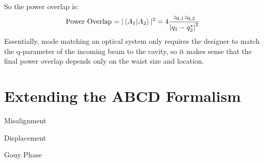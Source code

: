 \begin{appendices}
	So the power overlap is:
	\begin{equation}
	\text{Power Overlap} = \vert \braket{A_1|A_2} \vert^2 = 4 \frac{ z_{0,1}z_{0,2}}{\abs{q_1 - q_2^*}^2}
	\end{equation}
	Essentially, mode matching an optical system only requires the designer to match the q-parameter of the incoming beam to the cavity, so it makes sense that the final power overlap depends only on the waist size and location.

\chapter{Extending the ABCD Formalism}
Misalignment

Displacement

Gouy Phase

\end{appendices} 

